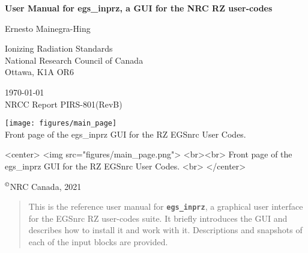 \documentclass[12pt,twoside]{article}   %
\newcommand{\supcopyright}{$^{\copyright}$}       %
\begin{document}
\begin{center}
{\sffamily \bfseries {\Huge User Manual for egs\_inprz, a GUI for the NRC RZ user-codes}
\vspace{5mm}\\}
\begin{Large}
Ernesto Mainegra-Hing \\
\end{Large}
Ionizing Radiation Standards\\
National Research Council of Canada
\\Ottawa, K1A OR6\\
\vspace{10mm}

\today \vspace{3mm}\\
\hfill NRCC Report {\sf PIRS-801}(RevB) \vspace*{10mm}\\

\begin{latexonly}
\begin{center}
\texttt{[image: figures/main\_page]}
\vspace{5mm}
\\Front page of the egs\_inprz GUI for the RZ EGSnrc User Codes.
\vspace{10mm}\\
\end{center}
\end{latexonly}
\begin{htmlonly}
\begin{rawhtml}
<center>
<img src="figures/main_page.png">
<br><br>
Front page of the egs\_inprz GUI for the RZ EGSnrc User Codes.
<br>
</center>
\end{rawhtml}
\end{htmlonly}

\supcopyright NRC Canada, 2021

\end{center}
\newpage   %
\mbox{}



\pagestyle{empty}

\pagestyle{fancy}



\newpage
\begin{abstract}

This is the reference user manual for {\bf \tt egs\_inprz}, a graphical user interface
for the EGSnrc RZ user-codes suite. It briefly introduces the GUI and describes how
to install it and work with it. Descriptions and snapshots of each of the input blocks
are provided.

\end{abstract}
\end{document}
